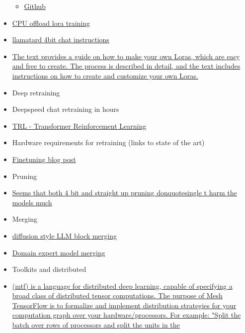 \begin{itemize}
  \begin{itemize}
   
  \item
    \href{https://github.com/tloen/alpaca-lora}{Github}
  \end{itemize}
\item
  \href{https://github.com/oobabooga/text-generation-webui/commit/09d8119e3cf36257496acfb44e6445a9f40c3d02}{CPU
  offload lora training}
\item
  \href{https://rentry.org/llama-tard-v2\#llama-int8-4bit-chatbot-guide-v2}{llamatard
  4bit chat instructions}
\item
  \href{https://civitai.com/models/22530}{The text provides a guide on
  how to make your own Loras, which are easy and free to create. The
  process is described in detail, and the text includes instructions on
  how to create and customize your own Loras.}
\item
  Deep retraining
\item
  Deepspeed chat retraining in hours
\item
  \href{https://github.com/lvwerra/trl}{TRL - Transformer Reinforcement
  Learning}
\item
  Hardware requirements for retraining (links to state of the art)
\item
  \href{https://www.databricks.com/blog/2023/03/20/fine-tuning-large-language-models-hugging-face-and-deepspeed.html}{Finetuning
  blog post}
\item
  Pruning
\item
  \href{https://arxiv.org/abs/1803.03635}{Seems that both 4 bit and
  straight up pruning donquotesingle t harm the models much}
\item
  Merging
\item
  \href{https://github.com/TehVenomm/LM_Transformers_BlockMerge}{diffusion
  style LLM block merging}
\item
  \href{https://docs.google.com/document/d/1JCzJ1wdBMBVwsFW4CWGUbX-YEDXB0yS4mfFbvwPLQrI/edit}{Domain
  expert model merging}
\item
  Toolkits and distributed
\item
  \href{https://github.com/tensorflow/mesh}{                (mtf) is a
  language for distributed deep learning, capable of specifying a broad
  class of distributed tensor computations. The purpose of Mesh
  TensorFlow is to formalize and implement distribution strategies for
  your computation graph over your hardware/processors. For example:
  "Split the batch over rows of processors and split the units in the
}
\end{itemize}
